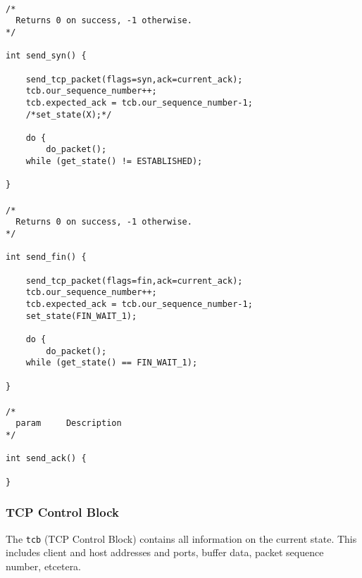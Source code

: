 \documentclass[11pt]{article}
\begin{document}
\paragraph{}



\begin{lstlisting}[title=Procedure send\_syn]
/*
  Returns 0 on success, -1 otherwise.
*/

int send_syn() {

    send_tcp_packet(flags=syn,ack=current_ack);
    tcb.our_sequence_number++;
    tcb.expected_ack = tcb.our_sequence_number-1;
    /*set_state(X);*/

    do {
        do_packet();
    while (get_state() != ESTABLISHED);

}
\end{lstlisting}


\paragraph{}


\begin{lstlisting}[title=Procedure send\_fin]
/*
  Returns 0 on success, -1 otherwise.
*/

int send_fin() {

    send_tcp_packet(flags=fin,ack=current_ack);
    tcb.our_sequence_number++;
    tcb.expected_ack = tcb.our_sequence_number-1;
    set_state(FIN_WAIT_1);

    do {
        do_packet();
    while (get_state() == FIN_WAIT_1);

}
\end{lstlisting}


\paragraph{}


\begin{lstlisting}[title=Procedure send\_ack]
/*
  param     Description
*/

int send_ack() {

}
\end{lstlisting}


\subsubsection{TCP Control Block}


The \lstinline|tcb| (TCP Control Block) contains all information on the
current state. This includes client and host addresses and ports, buffer
data, packet sequence number, etcetera.
\end{document}
